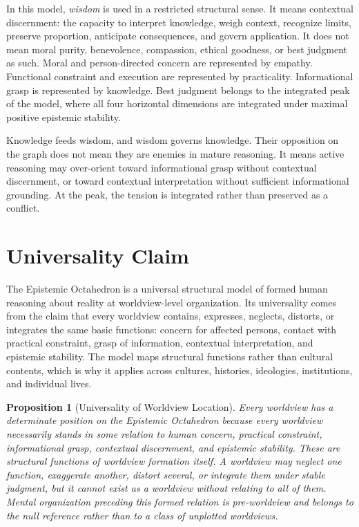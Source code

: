 \documentclass[11pt]{article}
\newtheorem{proposition}{Proposition}
\begin{document}
In this model, \emph{wisdom} is used in a restricted structural sense. It means contextual discernment: the capacity to interpret knowledge, weigh context, recognize limits, preserve proportion, anticipate consequences, and govern application. It does not mean moral purity, benevolence, compassion, ethical goodness, or best judgment as such. Moral and person-directed concern are represented by empathy. Functional constraint and execution are represented by practicality. Informational grasp is represented by knowledge. Best judgment belongs to the integrated peak of the model, where all four horizontal dimensions are integrated under maximal positive epistemic stability.

Knowledge feeds wisdom, and wisdom governs knowledge. Their opposition on the graph does not mean they are enemies in mature reasoning. It means active reasoning may over-orient toward informational grasp without contextual discernment, or toward contextual interpretation without sufficient informational grounding. At the peak, the tension is integrated rather than preserved as a conflict.

\section{Universality Claim}

The Epistemic Octahedron is a universal structural model of formed human reasoning about reality at worldview-level organization. Its universality comes from the claim that every worldview contains, expresses, neglects, distorts, or integrates the same basic functions: concern for affected persons, contact with practical constraint, grasp of information, contextual interpretation, and epistemic stability. The model maps structural functions rather than cultural contents, which is why it applies across cultures, histories, ideologies, institutions, and individual lives.

\begin{proposition}[Universality of Worldview Location]
Every worldview has a determinate position on the Epistemic Octahedron because every worldview necessarily stands in some relation to human concern, practical constraint, informational grasp, contextual discernment, and epistemic stability. These are structural functions of worldview formation itself. A worldview may neglect one function, exaggerate another, distort several, or integrate them under stable judgment, but it cannot exist as a worldview without relating to all of them. Mental organization preceding this formed relation is pre-worldview and belongs to the null reference rather than to a class of unplotted worldviews.
\end{proposition}
\end{document}
